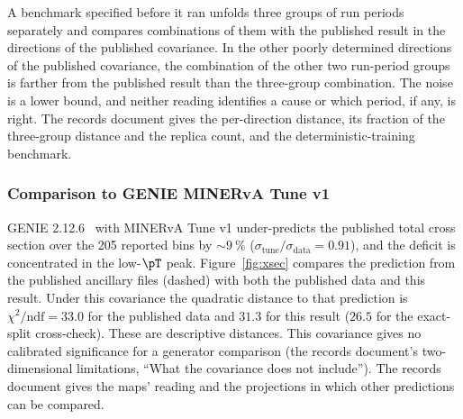 A benchmark specified before it ran unfolds three groups of run periods separately and compares combinations of them with the published result in the directions of the published covariance.  In the other  poorly determined directions of the published covariance, the combination of the other two run-period groups is farther from the published result than the three-group combination. The noise is a lower bound, and neither reading identifies a cause or which period, if any, is right. The records document gives the per-direction distance, its fraction of the three-group distance and the replica count, and the deterministic-training benchmark.



\subsubsection{Comparison to GENIE MINERvA Tune v1}
\label{sec:results-model}
GENIE 2.12.6~\cite{Andreopoulos:2009rq} with MINERvA Tune v1 under-predicts the published total cross section over the 205 reported bins by $\sim\SI{9}{\percent}$ ($\sigma_{\mathrm{tune}}/\sigma_{\mathrm{data}}=0.91$), and the deficit is concentrated in the low-$\pT$ peak. Figure~\ref{fig:xsec} compares the prediction from the published ancillary files (dashed) with both the published data and this result. Under this covariance the quadratic distance to that prediction is $\chi^{2}/\mathrm{ndf}=33.0$ for the published data and $31.3$ for this result ($26.5$ for the exact-split cross-check). These are descriptive distances. This covariance gives no calibrated significance for a generator comparison (the records document's two-dimensional limitations, ``What the covariance does not include''). The records document gives the maps' reading and the projections in which other predictions can be compared.

